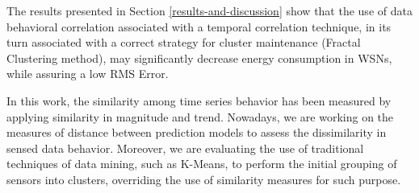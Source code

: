 \documentclass{acm_proc_article-sp}
\begin{document}
The results presented in Section \ref{results-and-discussion} show that the use
of data behavioral correlation associated with a temporal correlation technique,
in its turn associated with a correct strategy for cluster maintenance (Fractal
Clustering method), may significantly decrease energy consumption in WSNs, while
assuring a low RMS Error.

In this work, the similarity among time series behavior has been measured by
applying similarity in magnitude and trend. Nowadays, we are working on the
measures of distance between prediction models to assess the dissimilarity in
sensed data behavior. Moreover, we are evaluating the use of traditional
techniques of data mining, such as K-Means, to perform the initial grouping of
sensors into clusters, overriding the use of similarity measures for such
purpose.






%   
  
\end{document}
